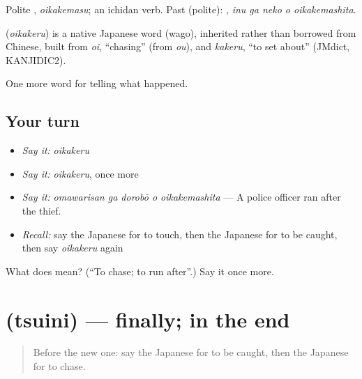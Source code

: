 Polite \textbf{}, \emph{oikakemasu}; an ichidan verb. Past (polite): \textbf{  }, \emph{inu ga neko o oikakemashita}.

\begin{cousinweb}
\textbf{} (\emph{oikakeru}) is a native Japanese word (wago), inherited rather than borrowed from Chinese, built from \emph{oi}, \textquotedblleft{}chasing\textquotedblright{} (from \emph{ou}), and \emph{kakeru}, \textquotedblleft{}to set about\textquotedblright{} (JMdict, KANJIDIC2).
\end{cousinweb}

\begin{grammarlens}[title={What you've built}]
One more word for telling what happened.
\end{grammarlens}

\subsection*{Your turn}
\begin{itemize}
\raggedright
  \item \emph{Say it:} \emph{oikakeru}
  \item \emph{Say it:} \emph{oikakeru}, once more
  \item \emph{Say it:} \emph{omawarisan ga dorobō o oikakemashita} — A police officer ran after the thief.
  \item \emph{Recall:} say the Japanese for to touch, then the Japanese for to be caught, then say \emph{oikakeru} again
\end{itemize}

\begin{tcolorbox}[breakable,colback=teal!4,colframe=teal!35!black,title={Before you move on}]
What does  mean? (\textquotedblleft{}To chase; to run after\textquotedblright{}.) Say it once more.
\end{tcolorbox}
\section[\texorpdfstring{\ja{ついに} (tsuini)}{ついに (tsuini)}]{ (tsuini) — finally; in the end}

\label{lesson:JA-C271-tsuini}



\begin{quote}
Before the new one: say the Japanese for to be caught, then the Japanese for to chase.
\end{quote}

